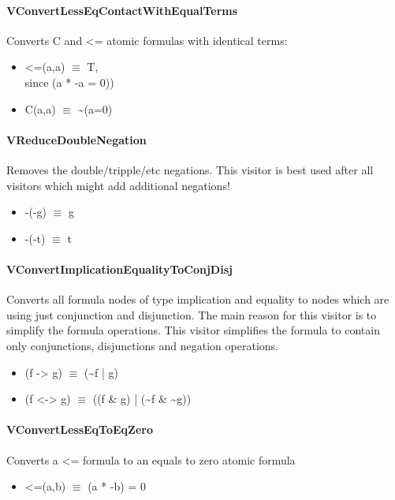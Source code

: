 \documentclass{article}
\begin{document}
	\paragraph{VConvertLessEqContactWithEqualTerms}
				Converts C and <= atomic formulas with identical terms:
				\begin{itemize}
					\item <=(a,a) $\equiv$ T, \\
						since (a * -a = 0))
					\item C(a,a) $\equiv$ \textasciitilde(a=0)
				\end{itemize}

	\paragraph{VReduceDoubleNegation}
				Removes the double/tripple/etc negations.
				This visitor is best used after all visitors which might add additional negations!
				\begin{itemize}
					\item -(-g) $\equiv$ g
					\item -(-t) $\equiv$ t
				\end{itemize}

	\paragraph{VConvertImplicationEqualityToConjDisj}
				Converts all formula nodes of type implication and equality to nodes
				which are using just conjunction and disjunction. The main reason for this visitor is to simplify the formula operations.
				This visitor simplifies the formula to contain only conjunctions, disjunctions and negation operations.
				\begin{itemize}
					\item (f -> g)  $\equiv$ (\textasciitilde f | g)
					\item (f <-> g) $\equiv$ ((f \& g) | (\textasciitilde f \& \textasciitilde g))
				\end{itemize}

	\paragraph{VConvertLessEqToEqZero}
				Converts a <= formula to an equals to zero atomic formula
				\begin{itemize}
					\item <=(a,b) $\equiv$ (a * -b) = 0
				\end{itemize}
\end{document}
